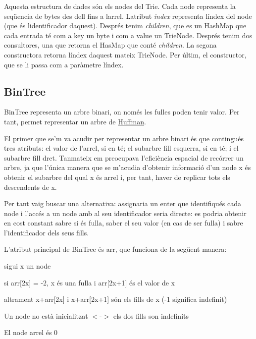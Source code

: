 Aquesta estructura de dades són els nodes del Trie. Cada node representa la seqüencia de bytes des d\textquotesingle{}ell fins a l\textquotesingle{}arrel. L\textquotesingle{}atribut {\itshape index} representa l\textquotesingle{}índex del node (que és l\textquotesingle{}identificador d\textquotesingle{}aquest). Després tenim {\itshape children}, que es un Hash\+Map que cada entrada té com a key un byte i com a value un Trie\+Node. Després tenim dos consultores, una que retorna el Has\+Map que conté {\itshape children}. La segona constructora retorna l\textquotesingle{}índex d\textquotesingle{}aquest mateix Trie\+Node. Per últim, el constructor, que se li passa com a paràmetre l\textquotesingle{}índex.

\subsection*{Bin\+Tree}

Bin\+Tree representa un arbre binari, on només les fulles poden tenir valor. Per tant, permet representar un arbre de \hyperlink{classHuffman}{Huffman}.

El primer que se’m va acudir per representar un arbre binari és que contingués tres atributs\+: el valor de l’arrel, si en té; el subarbre fill esquerra, si en té; i el subarbre fill dret. Tanmateix em preocupava l’eficiència espacial de recórrer un arbre, ja que l’única manera que se m’acudia d’obtenir informació d’un node x és obtenir el subarbre del qual x és arrel i, per tant, haver de replicar tots els descendents de x.

Per tant vaig buscar una alternativa\+: assignaria un enter que identifiqués cada node i l’accés a un node amb al seu identificador seria directe\+: es podria obtenir en cost constant sabre si és fulla, saber el seu valor (en cas de ser fulla) i sabre l’identificador dels seus fills.

L’atribut principal de Bin\+Tree és arr, que funciona de la següent manera\+:
\begin{DoxyItemize}
\item sigui x un node
\begin{DoxyItemize}
\item si arr\mbox{[}2x\mbox{]} = -\/2, x és una fulla i arr\mbox{[}2x+1\mbox{]} és el valor de x
\item altrament x+arr\mbox{[}2x\mbox{]} i x+arr\mbox{[}2x+1\mbox{]} són els fills de x (-\/1 significa indefinit)
\end{DoxyItemize}
\item Un node no està inicialitzat $<$-\/$>$ els dos fills son indefinits
\item El node arrel és 0
\end{DoxyItemize}

